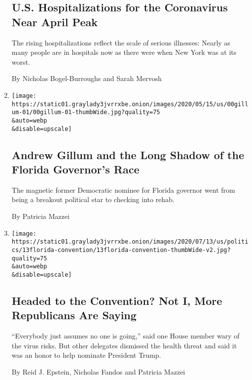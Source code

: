 \begin{enumerate}
  \hypertarget{us-hospitalizations-for-the-coronavirus-near-april-peak}{%
  \subsection{U.S. Hospitalizations for the Coronavirus Near April
  Peak}\label{us-hospitalizations-for-the-coronavirus-near-april-peak}}

  The rising hospitalizations reflect the scale of serious illnesses:
  Nearly as many people are in hospitals now as there were when New York
  was at its worst.

  By Nicholas Bogel-Burroughs and Sarah Mervosh
\item
  \href{/2020/07/21/us/andrew-gillum-incident.html}{}

  \texttt{[image: https://static01.graylady3jvrrxbe.onion/images/2020/05/15/us/00gillum-01/00gillum-01-thumbWide.jpg?quality=75\\\&auto=webp\\\&disable=upscale]}

  \hypertarget{andrew-gillum-and-the-long-shadow-of-the-florida-governors-race}{%
  \subsection{Andrew Gillum and the Long Shadow of the Florida
  Governor's
  Race}\label{andrew-gillum-and-the-long-shadow-of-the-florida-governors-race}}

  The magnetic former Democratic nominee for Florida governor went from
  being a breakout political star to checking into rehab.

  By Patricia Mazzei
\item
  \href{/2020/07/13/us/politics/florida-virus-republican-convention.html}{}

  \texttt{[image: https://static01.graylady3jvrrxbe.onion/images/2020/07/13/us/politics/13florida-convention/13florida-convention-thumbWide-v2.jpg?quality=75\\\&auto=webp\\\&disable=upscale]}

  \hypertarget{headed-to-the-convention-not-i-more-republicans-are-saying}{%
  \subsection{Headed to the Convention? Not I, More Republicans Are
  Saying}\label{headed-to-the-convention-not-i-more-republicans-are-saying}}

  ``Everybody just assumes no one is going,'' said one House member wary
  of the virus risks. But other delegates dismissed the health threat
  and said it was an honor to help nominate President Trump.

  By Reid J. Epstein, Nicholas Fandos and Patricia Mazzei
\end{enumerate}


